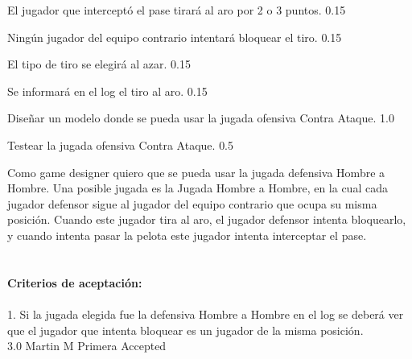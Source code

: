 		{El jugador que interceptó el pase tirará al aro por 2 o 3 puntos.} %
		{} %
		{0.15} %
		{} %
		{} %
		{} %

		{Ningún jugador del equipo contrario intentará bloquear el tiro.} %
		{} %
		{0.15} %
		{} %
		{} %
		{} %

		{El tipo de tiro se elegirá al azar.} %
		{} %
		{0.15} %
		{} %
		{} %
		{} %

		{Se informará en el log el tiro al aro.} %
		{} %
		{0.15} %
		{} %
		{} %
		{} %

		{Diseñar un modelo donde se pueda usar la jugada ofensiva Contra Ataque.} %
		{} %
		{1.0} %
		{} %
		{} %
		{} %


		{Testear la jugada ofensiva Contra Ataque.} %
		{} %
		{0.5} %
		{} %
		{} %
		{} %

\vspace{20pt}


	{Como game designer quiero que se pueda usar la jugada defensiva Hombre a Hombre.} %
	{Una posible jugada es la Jugada Hombre a Hombre, en la cual cada jugador defensor sigue al jugador del equipo contrario que ocupa su misma posición. Cuando este jugador tira al aro, el jugador defensor intenta bloquearlo, y cuando intenta pasar la pelota este jugador intenta interceptar el pase. \\
  \\
  \\
\textbf{Criterios de aceptación:}\\
  \\
1. Si la jugada elegida fue la defensiva Hombre a Hombre en el log se deberá ver que el jugador que intenta bloquear es un jugador de la misma posición. \\
} %
	{} %
	{3.0} %
	{Martin M} %
	{Primera} %
	{Accepted} %

